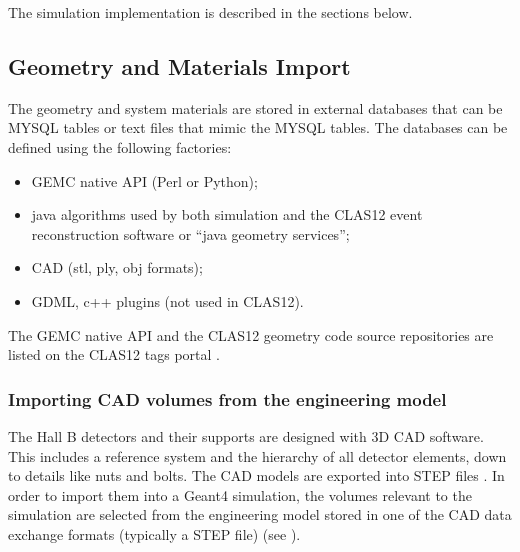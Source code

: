 The simulation implementation is described in the sections below.

\subsection{Geometry and Materials Import}

The geometry and system materials are stored in external databases that can be MYSQL tables or text files that mimic the MYSQL tables.
The databases can be defined using the following factories:

\begin{itemize}
	\item GEMC native API (Perl or Python);
	\item java algorithms used by both simulation and the CLAS12 event reconstruction software \cite{recon-nim} or ``java geometry services'';
	\item CAD (stl, ply, obj formats);
	\item GDML, c++ plugins (not used in CLAS12).
\end{itemize}

The GEMC native API and the CLAS12 geometry code source repositories are listed on the CLAS12 tags portal \cite{clas12Tags}.


\subsubsection{Importing CAD volumes from the engineering model}

The Hall B detectors and their supports are designed with 3D CAD software. This includes a reference system and the
hierarchy of all detector elements, down to details like nuts and bolts. The CAD models are exported into STEP files \cite{stepFiles}.
In order to import them into a Geant4 simulation, the volumes relevant to the simulation are selected from the engineering
model stored in one of the CAD data exchange formats (typically a STEP file) \cite{cadExchange} (see ).

